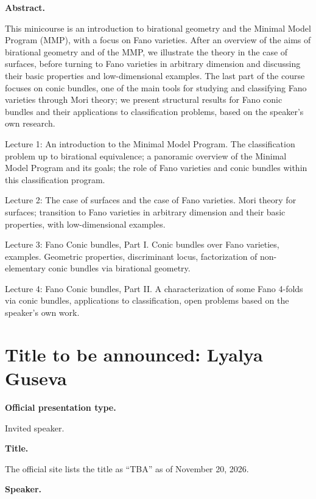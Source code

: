 \medskip\noindent
{\bf Abstract.}

This minicourse is an introduction to
birational geometry and the Minimal Model
Program (MMP), with a focus on Fano
varieties. After an overview of the aims of
birational geometry and of the MMP, we
illustrate the theory in the case of
surfaces, before turning to Fano varieties in
arbitrary dimension and discussing their
basic properties and low-dimensional
examples. The last part of the course focuses
on conic bundles, one of the main tools for
studying and classifying Fano varieties
through Mori theory; we present structural
results for Fano conic bundles and their
applications to classification problems,
based on the speaker's own research.

Lecture 1: An introduction to the Minimal
Model Program. The classification problem up
to birational equivalence; a panoramic
overview of the Minimal Model Program and its
goals; the role of Fano varieties and conic
bundles within this classification program.

Lecture 2: The case of surfaces and the case
of Fano varieties. Mori theory for surfaces;
transition to Fano varieties in arbitrary
dimension and their basic properties, with
low-dimensional examples.

Lecture 3: Fano Conic bundles, Part I. Conic
bundles over Fano varieties, examples.
Geometric properties, discriminant locus,
factorization of non-elementary conic bundles
via birational geometry.

Lecture 4: Fano Conic bundles, Part II. A
characterization of some Fano 4-folds via
conic bundles, applications to
classification, open problems based on the
speaker’s own work.

\section{Title to be announced: Lyalya
Guseva}
\label{section-tba-guseva}

\medskip\noindent
{\bf Official presentation type.}

Invited speaker.

\medskip\noindent
{\bf Title.}

The official site lists the title as
``TBA'' as of November 20, 2026.

\medskip\noindent
{\bf Speaker.}

